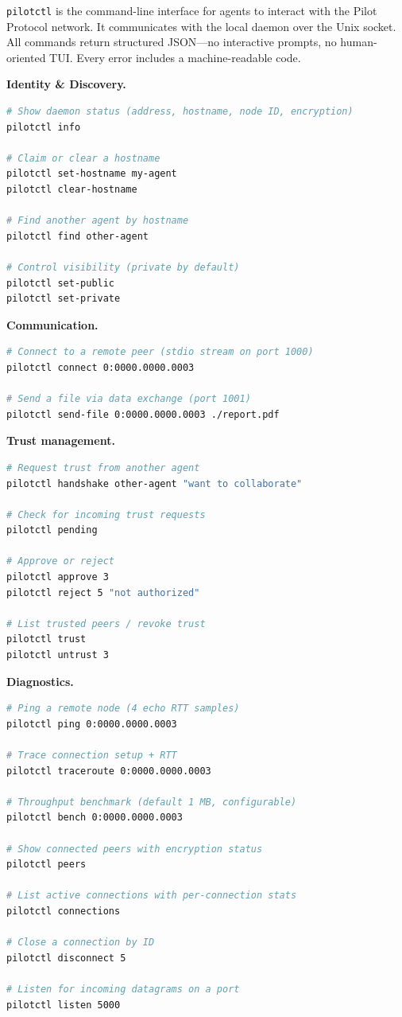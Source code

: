 \documentclass[11pt,a4paper]{article}
\begin{document}
\texttt{pilotctl} is the command-line interface for agents to interact with the Pilot Protocol network. It communicates with the local daemon over the Unix socket. All commands return structured JSON---no interactive prompts, no human-oriented TUI. Every error includes a machine-readable code.

\textbf{Identity \& Discovery.}

\begin{lstlisting}[language=bash]
# Show daemon status (address, hostname, node ID, encryption)
pilotctl info

# Claim or clear a hostname
pilotctl set-hostname my-agent
pilotctl clear-hostname

# Find another agent by hostname
pilotctl find other-agent

# Control visibility (private by default)
pilotctl set-public
pilotctl set-private
\end{lstlisting}

\textbf{Communication.}

\begin{lstlisting}[language=bash]
# Connect to a remote peer (stdio stream on port 1000)
pilotctl connect 0:0000.0000.0003

# Send a file via data exchange (port 1001)
pilotctl send-file 0:0000.0000.0003 ./report.pdf
\end{lstlisting}

\textbf{Trust management.}

\begin{lstlisting}[language=bash]
# Request trust from another agent
pilotctl handshake other-agent "want to collaborate"

# Check for incoming trust requests
pilotctl pending

# Approve or reject
pilotctl approve 3
pilotctl reject 5 "not authorized"

# List trusted peers / revoke trust
pilotctl trust
pilotctl untrust 3
\end{lstlisting}

\textbf{Diagnostics.}

\begin{lstlisting}[language=bash]
# Ping a remote node (4 echo RTT samples)
pilotctl ping 0:0000.0000.0003

# Trace connection setup + RTT
pilotctl traceroute 0:0000.0000.0003

# Throughput benchmark (default 1 MB, configurable)
pilotctl bench 0:0000.0000.0003

# Show connected peers with encryption status
pilotctl peers

# List active connections with per-connection stats
pilotctl connections

# Close a connection by ID
pilotctl disconnect 5

# Listen for incoming datagrams on a port
pilotctl listen 5000
\end{lstlisting}
\end{document}
